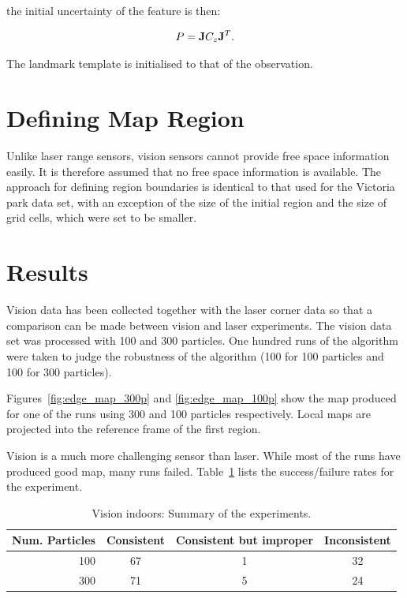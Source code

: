 the initial uncertainty of the feature is then:

$$
P = {\bf J} C_z {\bf J}^T.
$$

The landmark template is initialised to that of the observation.

\section{Defining Map Region}

Unlike laser range sensors, vision sensors cannot provide free space
information easily. It is therefore assumed that no free space
information is available. The approach for defining region boundaries
is identical to that used for the Victoria park data set, with an
exception of the size of the initial region and the size of grid
cells, which were set to be smaller.

\section{Results}

Vision data has been collected together with the laser corner data so
that a comparison can be made between vision and laser
experiments. The vision data set was processed with 100 and 300
particles. One hundred runs of the algorithm were taken to judge the
robustness of the algorithm (100 for 100 particles and 100 for 300
particles).

Figures~\ref{fig:edge_map_300p} and \ref{fig:edge_map_100p} show the
map produced for one of the runs using 300 and 100 particles
respectively. Local maps are projected into the reference frame of the
first region. 

Vision is a much more challenging sensor than laser. While most of the
runs have produced good map, many runs
failed. Table~\ref{tab:results_vision} lists the success/failure rates
for the experiment.

\begin{table}[ht]
\center
\begin{tabular}{r|c|c|c}
Num. Particles & Consistent & Consistent but improper & Inconsistent\\
\hline
100 & 67 & 1 & 32\\
300 & 71 & 5 & 24\\
\end{tabular}
\caption{Vision indoors: Summary of the experiments.}
\label{tab:results_vision}
\end{table}

